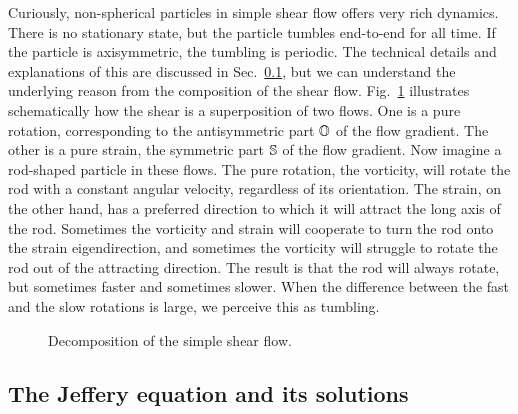 \documentclass[thesis.tex]{subfiles}
\begin{document}
Curiously, non-spherical particles in simple shear flow offers very rich dynamics. There is no stationary state, but the particle tumbles end-to-end for all time. If the particle is axisymmetric, the tumbling is periodic. The technical details and explanations of this are discussed in Sec.~\ref{sec:jefferyequation}, but we can understand the underlying reason from the composition of the shear flow. Fig.~\ref{fig:shear_decomposition} illustrates schematically how the shear is a superposition of two flows. One is a pure rotation, corresponding to the antisymmetric part $\mathbb{O}$ of the flow gradient. The other is a pure strain, the symmetric part $\mathbb{S}$ of the flow gradient. Now imagine a rod-shaped particle in these flows. The pure rotation, the vorticity, will rotate the rod with a constant angular velocity, regardless of its orientation. The strain, on the other hand, has a preferred direction to which it will attract the long axis of the rod. Sometimes the vorticity and strain will cooperate to turn the rod onto the strain eigendirection, and sometimes the vorticity will struggle to rotate the rod out of the attracting direction. The result is that the rod will always rotate, but sometimes faster and sometimes slower. When the difference between the fast and the slow rotations is large, we perceive this as tumbling.

\begin{figure}
\begin{center}
\end{center}
\caption{\label{fig:shear_decomposition} Decomposition of the simple shear flow.}%
\end{figure}


\subsection{The Jeffery equation and its solutions}\label{sec:jefferyequation}
\end{document}
